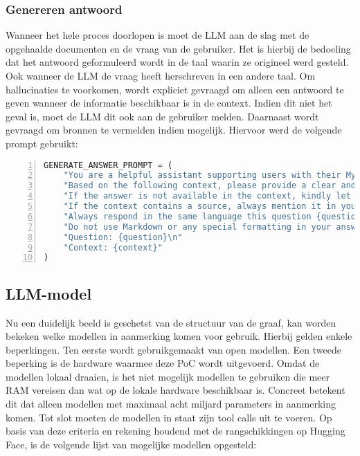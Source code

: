 \subsubsection{Genereren antwoord}

Wanneer het hele proces doorlopen is moet de LLM aan de slag met de opgehaalde documenten en de vraag van de gebruiker. Het is hierbij de bedoeling dat het antwoord geformuleerd wordt in de taal waarin ze origineel werd gesteld. Ook wanneer de LLM de vraag heeft herschreven in een andere taal. Om hallucinaties te voorkomen, wordt expliciet gevraagd om alleen een antwoord te geven wanneer de informatie beschikbaar is in de context. Indien dit niet het geval is, moet de LLM dit ook aan de gebruiker melden. Daarnaast wordt gevraagd om bronnen te vermelden indien mogelijk. Hiervoor werd de volgende prompt gebruikt: 

\begin{lstlisting}[basicstyle=\small, frame=single, breaklines=true, postbreak=\mbox{\textcolor{red}{$\hookrightarrow$}\space}, escapeinside ={\%,}, escapechar={!}, numbers=left, language=Python, caption=Prompt voor genereren van antwoord op basis van de opgehaalde context]
GENERATE_ANSWER_PROMPT = (
    "You are a helpful assistant supporting users with their MyMinfin IT-related questions.\n"
    "Based on the following context, please provide a clear and complete answer.\n"
    "If the answer is not available in the context, kindly let the user know that you don't have enough information.\n"
    "If the context contains a source, always mention it in your answer as the reference.\n"
    "Always respond in the same language this question {question} is asked, even if the context is in a different language.\n"
    "Do not use Markdown or any special formatting in your answer, respond in plain text only.\n\n"
    "Question: {question}\n"
    "Context: {context}"
)
\end{lstlisting}

\subsection{LLM-model}

Nu een duidelijk beeld is geschetst van de structuur van de graaf, kan worden bekeken welke modellen in aanmerking komen voor gebruik. Hierbij gelden enkele beperkingen. Ten eerste wordt gebruikgemaakt van open modellen. Een tweede beperking is de hardware waarmee deze PoC wordt uitgevoerd. Omdat de modellen lokaal draaien, is het niet mogelijk modellen te gebruiken die meer RAM vereisen dan wat op de lokale hardware beschikbaar is. Concreet betekent dit dat alleen modellen met maximaal acht miljard parameters in aanmerking komen. Tot slot moeten de modellen in staat zijn tool calls uit te voeren. Op basis van deze criteria en rekening houdend met de rangschikkingen op Hugging Face, is de volgende lijst van mogelijke modellen opgesteld:

